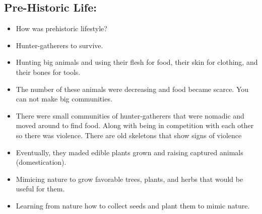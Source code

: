 \documentclass{article}
\begin{document}
\subsection{Pre-Historic Life:}
\begin{itemize}
  \item How was prehistoric lifestyle?
  \item Hunter-gatherers to survive.
  \item Hunting big animals and using their flesh for food,
    their skin for clothing, and their bones for tools.
  \item The number of these animals were decreasing and
    food became scarce. You can not make big communities.
  \item There were small communities of hunter-gatherers
    that were nomadic and moved around to find food.
    Along with being in competition with each other
    so there was violence.
    There are old skeletons that show signs of violence
  \item Eventually, they maded edible plants grown and raising captured animals (domestication).
  \item Mimicing nature to grow favorable trees, plants, and herbs that would be useful for them.
  \item Learning from nature how to collect seeds and plant them to mimic nature.
\end{itemize}
\end{document}
